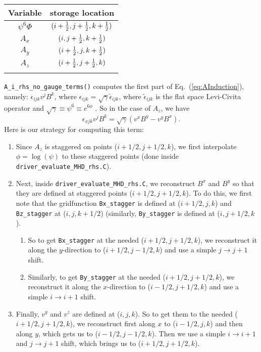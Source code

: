\documentclass[showpacs,amsmath,amssymb,prd]{revtex4}
\newcommand{\beq}{\begin{equation}}
\newcommand{\eeq}{\end{equation}}
\newcommand{\half} {{1\over 2}}
\begin{document}
\begin{center}
\begin{tabular}{cc}
\hline
  Variable & storage location \\
\hline
  $\psi^6\Phi$ & $(i+\half,j+\half,k+\half)$ \\
  $A_x$ & $(i,j+\half,k+\half)$ \\
  $A_y$ & $(i+\half,j,k+\half)$ \\
  $A_z$ & $(i+\half,j+\half,k)$ \\
\hline
\label{staggered_A_mu_table}
\end{tabular}
\end{center}

{\tt A\_i\_rhs\_no\_gauge\_terms()} computes the first part of Eq.~(\ref{eq:AInduction}),
namely: $\epsilon_{ijk} v^j B^k$, where $\epsilon_{ijk}=\sqrt{\gamma}
\tilde{\epsilon}_{ijk}$, where $\tilde{\epsilon}_{ijk}$ is the flat
space Levi-Civita operator and $\sqrt{\gamma}\equiv \psi^6 \equiv e^{6
  \phi}$ . So in the case of $A_z$, we have
\beq
\epsilon_{xjk} v^j B^k = \sqrt{\gamma} ( v^x B^y - v^y B^x ).
\label{eq:AInduction_firstpart}
\eeq
Here is our strategy for computing this term:

\begin{enumerate}
\item Since $A_z$ is staggered on points ($i+1/2,j+1/2,k$), we first
  interpolate $\phi=\log(\psi)$ to these staggered points (done inside
  {\tt driver\_evaluate\_MHD\_rhs.C}). 
\item Next, inside {\tt driver\_evaluate\_MHD\_rhs.C}, we reconstruct
  $B^x$ and $B^y$ so that they are defined at staggered points
  ($i+1/2,j+1/2,k$). To do this, we first note that the gridfunction 
  {\tt Bx\_stagger} is defined at ($i+1/2,j,k$) and {\tt Bz\_stagger}
  at ($i,j,k+1/2$) (similarly, {\tt   By\_stagger} is defined at
  ($i,j+1/2,k$).
  \begin{enumerate}
  \item So to get {\tt Bx\_stagger} at the needed ($i+1/2,j+1/2,k$),
    we reconstruct it along the $y$-direction to ($i+1/2,j-1/2,k$) and
    use a simple $j\to j+1$ shift.
    
  \item Similarly, to get {\tt By\_stagger} at the needed
    ($i+1/2,j+1/2,k$), we reconstruct it along the $x$-direction to
    ($i-1/2,j+1/2,k$) and use a simple $i\to i+1$ shift.
  \end{enumerate}
\item Finally, $v^y$ and $v^z$ are defined at ($i,j,k$). So to get them to
  the needed ($i+1/2,j+1/2,k$), we reconstruct first along $x$ to
  ($i-1/2,j,k$) and then along $y$, which gets us to
  ($i-1/2,j-1/2,k$). Then we use a simple $i\to i+1$ and $j\to j+1$
  shift, which brings us to ($i+1/2,j+1/2,k$).
\end{enumerate}
\end{document}

